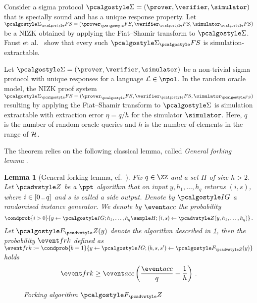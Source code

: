 \let\accentvec\vec \documentclass[runningheads]{llncs}
\newtheorem{lemma}[theorem]{Lemma}
\begin{document}
Consider a sigma protocol $\sigmaprot = (\prover, \verifier, \simulator)$ that
is specially sound and has a unique response property. Let $\sigmaprot_\fs = (\prover_\fs, \verifier_\fs, \simulator_\fs)$ be a NIZK obtained by applying the Fiat--Shamir transform to $\sigmaprot$.
Faust et al.~\cite{INDOCRYPT:FKMV12} show that every such $\sigmaprot_\fs$ is simulation-extractable.

\begin{theorem}
	Let $\sigmaprot = (\prover, \verifier, \simulator)$ be a non-trivial sigma protocol with unique responses for a language $\LANG \in \npol$.
	In the random oracle model, the NIZK proof system $\sigmaprot_\fs = (\prover_\fs, \verifier_\fs, \simulator_{\fs})$ resulting by applying the Fiat--Shamir transform to $\sigmaprot$ is simulation extractable with extraction error $\eta = q/h$ for the simulator $\simulator$. Here, $q$ is the number of random oracle queries and $h$ is the number of elements in the range of $\mathcal{H}$.
\end{theorem}

The theorem relies on the following classical lemma, called \emph{General forking lemma} \cite{JC:PoiSte00}.

\begin{lemma}[General forking lemma, cf.~\cite{INDOCRYPT:FKMV12,CCS:BelNev06}]
	\label{lem:forking_lemma}
	Fix $q \in \ZZ$ and a set $H$ of size $h > 2$. Let $\zdv$ be a $\ppt$ algorithm that on input $y, h_1, \ldots, h_q$ returns $(i, s)$, where $i \in[0 \, .. \, q]$ and $s$ is called a \emph{side output}.
	Denote by $\ig$ a randomised instance generator.
	We denote by $\accProb$ the probability
	\[
		\condprob{i > 0}{y \gets \ig; h_1, \ldots, h_q \sample H; (i, s) \gets
		\zdv(y, h_1, \ldots, h_q)}\,.
	\]
	Let $\forking_\zdv(y)$ denote the algorithm described in \cref{fig:forking_lemma}, then the probability $\frkProb$ defined as
	$
		\frkProb := \condprob{b = 1}{y \gets \ig; (b, s, s') \gets
		\forking_{\zdv}(y)}
	$
	holds
	\[
		\frkProb \geq \accProb \brak{\frac{\accProb}{q} - \frac{1}{h}}\,.
	\]
	\begin{figure}[t]
		\centering
		\caption{Forking algorithm $\forking_\zdv$}
		\label{fig:forking_lemma}
\end{figure}
\end{lemma}
\end{document}
